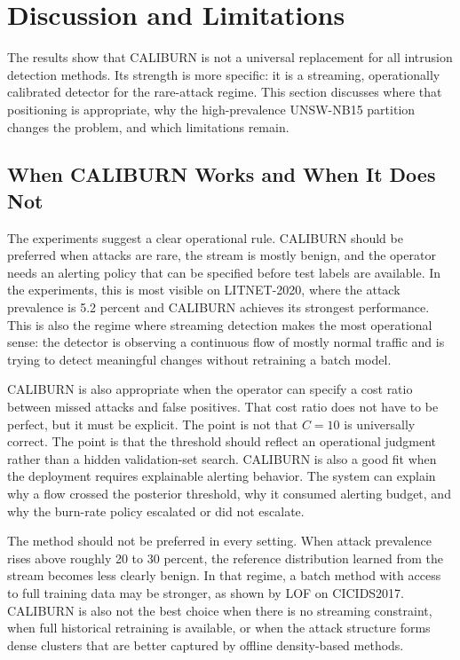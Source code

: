 \documentclass[preprint,12pt,authoryear]{elsarticle}
\newcommand{\caliburn}{CALIBURN}
\begin{document}
\section{Discussion and Limitations}
\label{sec:discussion}

The results show that \caliburn{} is not a universal replacement for all intrusion detection methods. Its strength is more specific: it is a streaming, operationally calibrated detector for the rare-attack regime. This section discusses where that positioning is appropriate, why the high-prevalence UNSW-NB15 partition changes the problem, and which limitations remain.

\subsection{When \caliburn{} Works and When It Does Not}
\label{sec:disc-positioning}

The experiments suggest a clear operational rule. \caliburn{} should be preferred when attacks are rare, the stream is mostly benign, and the operator needs an alerting policy that can be specified before test labels are available. In the experiments, this is most visible on LITNET-2020, where the attack prevalence is 5.2 percent and \caliburn{} achieves its strongest performance. This is also the regime where streaming detection makes the most operational sense: the detector is observing a continuous flow of mostly normal traffic and is trying to detect meaningful changes without retraining a batch model.

\caliburn{} is also appropriate when the operator can specify a cost ratio between missed attacks and false positives. That cost ratio does not have to be perfect, but it must be explicit. The point is not that $C = 10$ is universally correct. The point is that the threshold should reflect an operational judgment rather than a hidden validation-set search. \caliburn{} is also a good fit when the deployment requires explainable alerting behavior. The system can explain why a flow crossed the posterior threshold, why it consumed alerting budget, and why the burn-rate policy escalated or did not escalate.

The method should not be preferred in every setting. When attack prevalence rises above roughly 20 to 30 percent, the reference distribution learned from the stream becomes less clearly benign. In that regime, a batch method with access to full training data may be stronger, as shown by LOF on CICIDS2017. \caliburn{} is also not the best choice when there is no streaming constraint, when full historical retraining is available, or when the attack structure forms dense clusters that are better captured by offline density-based methods.
\end{document}
